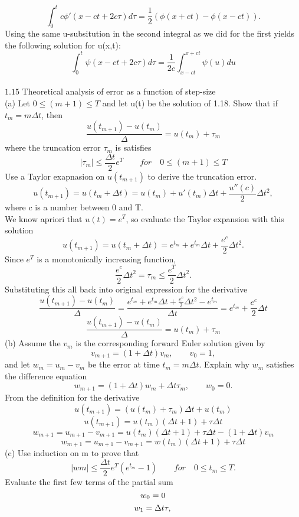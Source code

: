 \documentclass{article}
\begin{document}
\[ \int_{0}^{t}c\phi'(x-ct +2c\tau)d\tau = \frac{1}{2}(\phi(x+ct)-\phi(x-ct)).\]
Using the same u-subsitution in the second integral as we did for the first yields the following solution for u(x,t):
\[ \int_{0}^{t}\psi(x-ct+2c\tau)d\tau= \frac{1}{2c}\int_{x-ct}^{x+ct}\psi(u)du\]
	\\
\large $1.15$ Theoretical analysis of error as a function of step-size\\
\normalsize
(a) Let $0\le(m+1) \le T$ and let u(t) be the solution of 1.18. Show that if $t_{m} = m \Delta t$, then
\[\frac{u(t_{m+1}) - u(t_{m})}{\Delta} = u(t_{m}) +\tau_{m}\]
where the truncation error $\tau_{m}$ is satisfies
\[ |\tau_{m}| \le \frac{\Delta t}{2}e^T\qquad for\quad 0\le(m+1)\le T\]
Use a Taylor exapnasion on $u(t_{m+1})$ to derive the truncation error. \\
\[u(t_{m+1}) = u(t_{m} +\Delta t) = u(t_{m}) + u'(t_{m})\Delta t + \frac{u''(c)}{2}\Delta t^2,\] 
 where c is a number between 0 and T.\\
We know apriori that $u(t) = e^T$, so evaluate the Taylor expansion with this solution
\[u(t_{m+1}) = u(t_{m} +\Delta t) = e^{t_{m}}+ e^{t_{m}}\Delta t +\frac{e^c}{2}\Delta t^2.\] 
Since $e^T$ is a monotonically increasing function,
\[\frac{e^c}{2}\Delta t^2 = \tau_{m} \le \frac{e^T}{2}\Delta t^2 .\]
Substituting this all back into original expression for the derivative
\[\frac{u(t_{m+1}) - u(t_{m})}{\Delta} = \frac{e^{t_{m}}+ e^{t_{m}}\Delta t +\frac{e^c}{2}\Delta t^2 -{e^{t_{m}}}}{\Delta t}=e^{t_{m}} + \frac{e^c}{2}\Delta t\]
\[\frac{u(t_{m+1}) - u(t_{m})}{\Delta} =  u(t_{m}) +\tau_{m}\]
(b)  Assume the ${v_{m}}$ is the corresponding forward Euler solution given by
\[v_{m+1} = (1+\Delta t)v_{m},\qquad v_{0} = 1,\]
and let $w_{m} = u_{m}-v_{m}$ be the error at time $t_{m} = m\Delta t.$ Explain why ${w_{m}}$ satisfies the difference equation
\[ w_{m+1} = (1+\Delta t)w_{m} + \Delta t \tau_{m}, \qquad w_{0} = 0.\]
From the definition for the derivative
\[ u(t_{m+1}) = (u(t_{m}) + \tau_{m})\Delta t + u(t_{m})\]
\[ u(t_{m+1})  = u(t_{m})(\Delta t +1) + \tau \Delta t\]
\[w_{m+1} = u_{m+1} - v_{m+1} = u(t_{m})(\Delta t +1) + \tau \Delta t-(1+\Delta t)v_{m}\]
\[w_{m+1} = u_{m+1} - v_{m+1} = w(t_{m})(\Delta t +1) + \tau \Delta t\]
(c) Use induction on m to prove that
\[ |wm| \le \frac{\Delta t}{2}e^T(e^{t_{m}}-1)\qquad for\quad 0\le t_{m} \le T.\]
Evaluate the first few terms of the partial sum\\
$$
w_{0} = 0\\
$$
$$
w_{1} = \Delta t \tau,\\
$$
\end{document}
